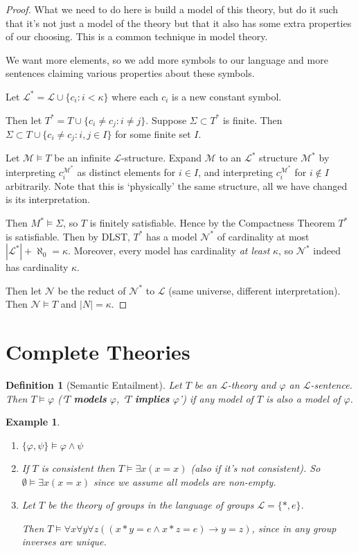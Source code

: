 \documentclass[]{article}
\theoremstyle{custhm}
\theoremstyle{cusdef}
\newtheorem{defin}[theorem]{Definition}
\theoremstyle{custhm}
\theoremstyle{custhm}
\theoremstyle{custhm}
\theoremstyle{ex}
\newtheorem{ex}[theorem]{Example}
\theoremstyle{custhm}
\theoremstyle{cusdef}
\theoremstyle{remark}
\newcommand{\ra}{\rightarrow}
\newcommand{\undf}[1]{\textit{\textbf{#1}}}
\renewcommand{\L}{\mathcal{L}}
\renewcommand{\it}[1]{\textit{#1}}
\newcommand{\M}{\mathcal{M}}
\renewcommand{\phi}{\varphi}
\begin{document}
\begin{proof}
What we need to do here is build a model of this theory, but do it such that it's not just a model of the theory but that it also has some extra properties of our choosing. This is a common technique in model theory.

We want more elements, so we add more symbols to our language and more sentences claiming various properties about these symbols.

Let $\L^\ast = \L \cup \{c_i : i < \kappa\}$ where each $c_i$ is a new constant symbol.

Then let $T^\ast = T\cup \{c_i\ne c_j: i\ne j\}$. Suppose $\Sigma \subset T^\ast$ is finite. Then $\Sigma \subset T\cup\{c_i\ne c_j:i,j\in I\}$ for some finite set $I$.

Let $\M\models T$ be an infinite $\L$-structure. Expand $\M$ to an $\L^{\ast}$ structure $\M^\ast$ by interpreting $c_i^{\M^\ast}$ as distinct elements for $i\in I$, and interpreting $c_i^{\M^\ast}$ for $i\not\in I$ arbitrarily. Note that this is `physically' the same structure, all we have changed is its interpretation.

Then $M^{\ast}\models\Sigma$, so $T$ is finitely satisfiable. Hence by the Compactness Theorem $T^\ast$ is satisfiable. Then by DLST, $T^\ast$ has a model $\mathcal{N}^\ast$ of cardinality at most $|\L^\ast|+\aleph_0 = \kappa$. Moreover, every model has cardinality \it{at least} $\kappa$, so $\mathcal{N}^\ast$ indeed has cardinality $\kappa$.

Then let $\mathcal{N}$ be the reduct of $\mathcal{N}^\ast$ to $\L$ (same universe, different interpretation). Then $\mathcal{N}\models T$ and $|N| = \kappa$.
\end{proof}

\section{Complete Theories}

\begin{defin}[Semantic Entailment]
Let $T$ be an $\L$-theory and $\phi$ an $\L$-sentence. Then $T\models \phi$ (`$T$ \undf{models} $\phi$, `$T$ \undf{implies} $\phi$') if any model of $T$ is also a model of $\phi$.
\end{defin}

\begin{ex}\ 
\begin{enumerate}[label=\arabic*)]
\item $\{\phi,\psi\}\models \phi\land\psi$
\item If $T$ is consistent then $T\models \exists x(x=x)$ (also if it's not consistent). So $\emptyset \models \exists x(x=x)$ since we assume all models are non-empty.
\item Let $T$ be the theory of groups in the language of groups $\L = \{\ast,e\}$.

Then $T\models \forall x\forall y\forall z\left((x\ast y = e\land x\ast z = e)\ra y=z\right)$, since in any group inverses are unique.
\end{enumerate}
\end{ex}
\end{document}
